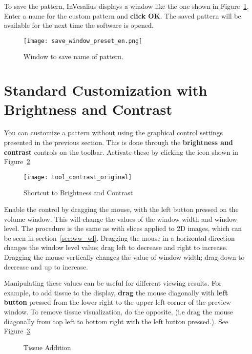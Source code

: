 To save the pattern, InVesalius displays a window like the one shown in Figure~\ref{fig:save_window_preset}. Enter a name for the custom pattern and \textbf{click OK}. The saved pattern will be available for the next time the software is opened.

\begin{figure}[!htb]
\centering
\texttt{[image: save\_window\_preset\_en.png]}
\caption{Window to save name of pattern.}
\label{fig:save_window_preset}
\end{figure}

\section{Standard Customization with Brightness and Contrast}

You can customize a pattern without using the graphical control settings presented in the previous section. This is done through the \textbf{brightness and contrast} controls on the toolbar. Activate these by clicking the icon shown in Figure~\ref{fig:tool_contrast_original_vol}.

\begin{figure}[!htb]
\centering
\texttt{[image: tool\_contrast\_original]}
\caption{Shortcut to Brightness and Contrast}
\label{fig:tool_contrast_original_vol}
\end{figure}

Enable the control by dragging the mouse, with the left button pressed on the volume window. This will change the values of the window width and window level. The procedure is the same as with slices applied to 2D images, which can be seen in section~\ref{sec:ww_wl}. Dragging the mouse in a horizontal direction changes the window level value; drag left to decrease and right to increase. Dragging the mouse vertically changes the value of window width; drag down to decrease and up to increase.

Manipulating these values can be useful for different viewing results. For example, to add tissue to the display, \textbf{drag} the mouse diagonally with \textbf{left button} pressed from the lower right to the upper left corner of the preview window. To remove tissue visualization, do the opposite, (i.e drag the mouse diagonally from top left to bottom right with the left button pressed.). See Figure~\ref{fig:raycasting_add}.

\begin{figure}[!htb]
  \centering
  \hfill
  \hfill  
  \caption{Tissue Addition}
  \label{fig:raycasting_add}
\end{figure}

